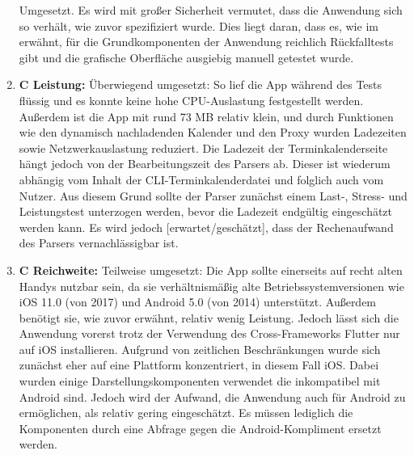 \begin{enumerate}
		Umgesetzt. Es wird mit großer Sicherheit vermutet, dass die Anwendung sich so verhält, wie zuvor spezifiziert wurde. Dies liegt daran, dass es, wie im  erwähnt, für die Grundkomponenten der Anwendung reichlich Rückfalltests gibt und die grafische Oberfläche ausgiebig manuell getestet wurde.%
	\item \textbf{C Leistung:}\newline%
		Überwiegend umgesetzt: %
		So lief die App während des Tests flüssig und es konnte keine hohe CPU-Auslastung festgestellt werden. %
		Außerdem ist die App mit rund 73 MB relativ klein, und durch Funktionen wie den dynamisch nachladenden Kalender und den Proxy wurden Ladezeiten sowie Netzwerkauslastung reduziert. %
		Die Ladezeit der Terminkalenderseite hängt jedoch von der Bearbeitungszeit des Parsers ab. Dieser ist wiederum abhängig vom Inhalt der CLI-Terminkalenderdatei und folglich auch vom Nutzer. Aus diesem Grund sollte der Parser zunächst einem Last-, Stress- und Leistungstest unterzogen werden, bevor die Ladezeit endgültig eingeschätzt werden kann. Es wird jedoch [erwartet/geschätzt], dass der Rechenaufwand des Parsers vernachlässigbar ist.%
	\item \textbf{C Reichweite:}\newline%
		Teilweise umgesetzt: %
		Die App sollte einerseits auf recht alten Handys nutzbar sein, da sie verhältnismäßig alte Betriebssystemversionen wie iOS 11.0 (von 2017) und Android 5.0 (von 2014) unterstützt. Außerdem benötigt sie, wie zuvor erwähnt, relativ wenig Leistung. %
		Jedoch lässt sich die Anwendung vorerst trotz der Verwendung des Cross-Frameworks Flutter nur auf iOS installieren. Aufgrund von zeitlichen Beschränkungen wurde sich zunächst eher auf eine Plattform konzentriert, in diesem Fall iOS. Dabei wurden einige Darstellungskomponenten verwendet die inkompatibel mit Android sind. Jedoch wird der Aufwand, die Anwendung auch für Android zu ermöglichen, als relativ gering eingeschätzt. Es müssen lediglich die Komponenten durch eine Abfrage gegen die Android-Kompliment ersetzt werden.%
\end{enumerate}